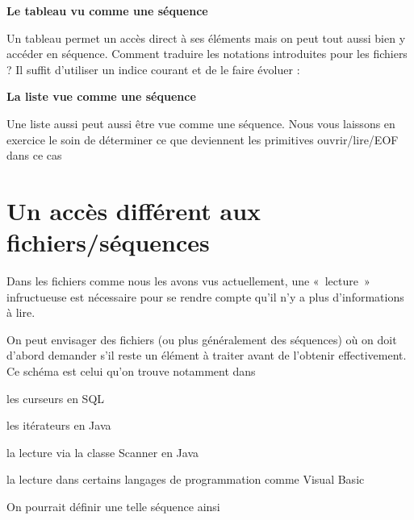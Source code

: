 {\sffamily\bfseries\upshape
Le tableau vu comme une séquence}

Un tableau permet un accès direct à ses éléments mais on peut tout aussi
bien y accéder en séquence. Comment traduire les notations introduites
pour les fichiers ? Il suffit d'utiliser un indice
courant et de le faire évoluer :


{\sffamily\bfseries\upshape
La liste vue comme une séquence}

Une liste aussi peut aussi être vue comme une séquence. Nous vous
laissons en exercice le soin de déterminer ce que deviennent les
primitives ouvrir/lire/\textsf{EOF} dans ce cas

\section{Un accès différent aux fichiers/séquences}

Dans les fichiers comme nous les avons vus actuellement, une «~lecture~»
infructueuse est nécessaire pour se rendre compte
qu'il n'y a plus
d'informations à lire. 

On peut envisager des fichiers (ou plus généralement des séquences) où
on doit d'abord demander s'il reste
un élément à traiter avant de l'obtenir effectivement.
Ce schéma est celui qu'on trouve notamment dans 

\begin{liste}
	\item 
		les curseurs en SQL
	\item 
		les itérateurs en Java
	\item 
		la lecture via la classe Scanner en Java
	\item 
		la lecture dans certains langages de programmation comme Visual Basic
\end{liste}

On pourrait définir une telle séquence ainsi


